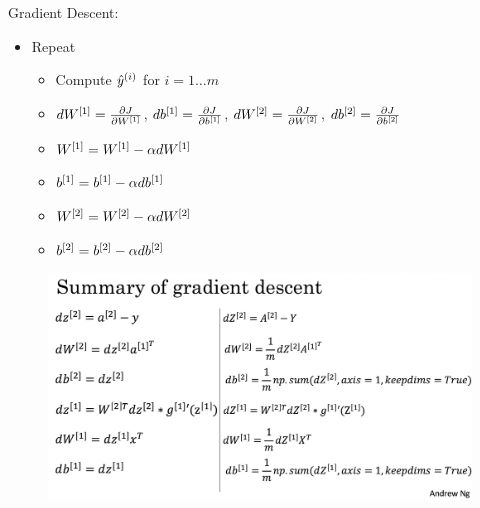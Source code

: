 Gradient Descent: 
\begin{itemize}
	\item Repeat
	\begin{itemize}
		\item[] Compute $\hat{y}^{(i)}$ for $i=1\dots m$
		\item[] $dW^{[1]}=\frac{\partial J}{\partial W^{[1]}}$, $db^{[1]}=\frac{\partial J}{\partial b^{[1]}}$, $dW^{[2]}=\frac{\partial J}{\partial W^{[2]}}$, $db^{[2]}=\frac{\partial J}{\partial b^{[2]}}$
		\item[] $W^{[1]} = W^{[1]} - \alpha dW^{[1]}$
		\item[] $b^{[1]} = b^{[1]} - \alpha db^{[1]}$
		\item[] $W^{[2]} = W^{[2]} - \alpha dW^{[2]}$
		\item[] $b^{[2]} = b^{[2]} - \alpha db^{[2]}$
	\end{itemize}
\end{itemize}

\begin{figure}[h]
\includegraphics[scale=0.2]{images/grad_summary.png}
\centering
\end{figure}